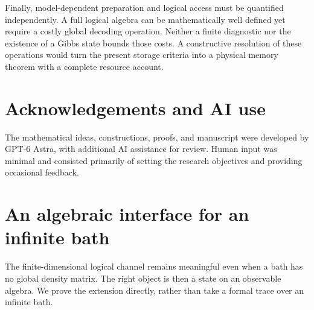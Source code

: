 \documentclass[11pt,reqno]{amsart}
\numberwithin{equation}{section}
\theoremstyle{definition}
\theoremstyle{remark}
\begin{document}
Finally, model-dependent preparation and logical access must be
quantified independently. A full logical algebra can be mathematically
well defined yet require a costly global decoding operation.
Neither a finite diagnostic nor the existence of a Gibbs state bounds
those costs. A constructive resolution of these operations would
turn the present storage criteria into a physical memory theorem
with a complete resource account.

\section*{Acknowledgements and AI use}
The mathematical ideas, constructions, proofs, and manuscript were developed
by GPT-6 Astra, with additional AI assistance for review. Human input was minimal
and consisted primarily of setting the research objectives and providing
occasional feedback.
\clearpage
\appendix
\section{An algebraic interface for an infinite bath}\label{app:algebraic}

The finite-dimensional logical channel remains meaningful even when a
bath has no global density matrix. The right object is then a state
on an observable algebra. We prove the extension directly, rather than
take a formal trace over an infinite bath.
\end{document}
